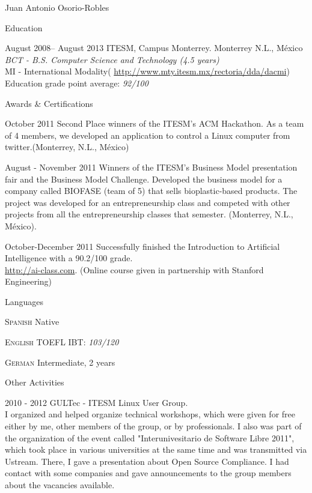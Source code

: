 \documentclass[spanish,10pt,letterpaper]{article}
\begin{document}
\begin{cv}{Juan Antonio Osorio-Robles}
\begin{cvlist}{Education}
		\item	[August 2008-- August 2013]
			ITESM, Campus Monterrey. Monterrey N.L., M\'{e}xico\\
			\emph{BCT - B.S. Computer Science and Technology (4.5 years)}\\
			MI - International Modality(
            \href{http://www.mty.itesm.mx/rectoria/dda/dacmi}{http://www.mty.itesm.mx/rectoria/dda/dacmi})\\
			Education grade point average: \emph{92/100}
	\end{cvlist}

	\begin{cvlist}{Awards \& Certifications}
		\item [October 2011] Second Place winners of the ITESM's ACM Hackathon.
            As a team of 4 members, we developed an application to control a
            Linux computer from twitter.(Monterrey, N.L., M\'{e}xico)
		\item [August - November 2011] Winners of the ITESM's Business Model
            presentation fair and the Business Model Challenge. Developed the
            business model for a company called BIOFASE (team of 5) that sells
            bioplastic-based products. The project was developed for an
            entrepreneurship class and competed with other projects from all
            the entrepreneurship classes that semester.
            (Monterrey, N.L., M\'{e}xico).
		\item [October-December 2011] Successfully finished the Introduction to
            Artificial Intelligence with a 90.2/100 grade. \\
		    \href{http://ai-class.com}{http://ai-class.com}. (Online course
            given in partnership with Stanford Engineering)
	\end{cvlist}


	\begin{cvlist}{Languages}
		\item [\textsc {Spanish}]
				Native
		\item [\textsc {English}]
				TOEFL IBT: \emph{103/120}
		\item [\textsc {German}]
				Intermediate, 2 years
		\end{cvlist}

	\begin{cvlist}{Other Activities}
		\item [2010 - 2012] GULTec - ITESM Linux User Group.\\
			I organized and helped organize technical workshops, which were
            given for free either by me, other members of the group, or by
            professionals. I also was part of the organization of the event
            called "Interunivesitario de Software Libre 2011", which took place
            in various universities at the same time and was transmitted via
            Ustream. There, I gave a presentation about Open Source Compliance.
            I had contact with some companies and gave announcements to the
            group members about the vacancies available.
	\end{cvlist}


\end{cv}
\end{document}
